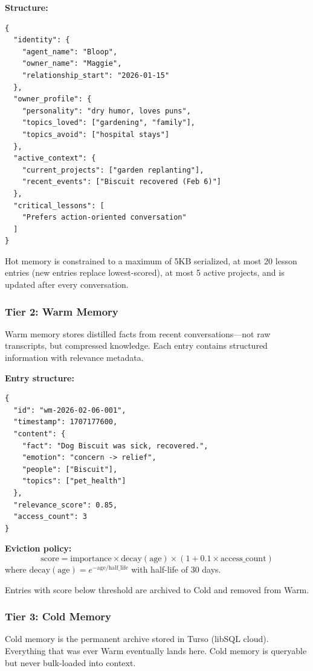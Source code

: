 \documentclass[conference]{IEEEtran}
\begin{document}
\textbf{Structure:}
\begin{lstlisting}[style=jsoncode]
{
  "identity": {
    "agent_name": "Bloop",
    "owner_name": "Maggie",
    "relationship_start": "2026-01-15"
  },
  "owner_profile": {
    "personality": "dry humor, loves puns",
    "topics_loved": ["gardening", "family"],
    "topics_avoid": ["hospital stays"]
  },
  "active_context": {
    "current_projects": ["garden replanting"],
    "recent_events": ["Biscuit recovered (Feb 6)"]
  },
  "critical_lessons": [
    "Prefers action-oriented conversation"
  ]
}
\end{lstlisting}

Hot memory is constrained to a maximum of 5KB serialized, at most 20 lesson entries (new entries replace lowest-scored), at most 5 active projects, and is updated after every conversation.

\subsubsection{Tier 2: Warm Memory}

Warm memory stores distilled facts from recent conversations—not raw transcripts, but compressed knowledge. Each entry contains structured information with relevance metadata.

\textbf{Entry structure:}
\begin{lstlisting}[style=jsoncode]
{
  "id": "wm-2026-02-06-001",
  "timestamp": 1707177600,
  "content": {
    "fact": "Dog Biscuit was sick, recovered.",
    "emotion": "concern -> relief",
    "people": ["Biscuit"],
    "topics": ["pet_health"]
  },
  "relevance_score": 0.85,
  "access_count": 3
}
\end{lstlisting}

\textbf{Eviction policy:}
\begin{equation}
\text{score} = \text{importance} \times \text{decay}(\text{age}) \times (1 + 0.1 \times \text{access\_count})
\end{equation}
where $\text{decay}(\text{age}) = e^{-\text{age}/\text{half\_life}}$ with half-life of 30 days.

Entries with score below threshold are archived to Cold and removed from Warm.

\subsubsection{Tier 3: Cold Memory}

Cold memory is the permanent archive stored in Turso (libSQL cloud). Everything that was ever Warm eventually lands here. Cold memory is queryable but never bulk-loaded into context.
\end{document}
